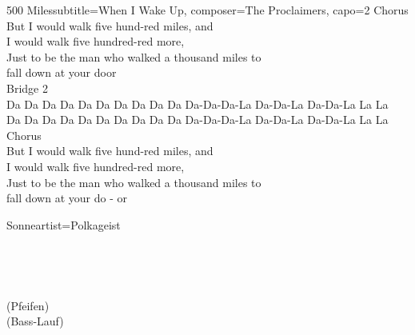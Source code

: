 \begin{song}{500 Miles}{subtitle={When I Wake Up}, composer={The Proclaimers}, capo={2}}
Chorus \\
But I would walk five hund-red miles, and \\
I would walk five hundred-red  more, \\
Just to be the man who walked a thousand  miles to \\
fall down at your door    \\

Bridge 2 \\

Da Da Da Da          Da Da Da Da      Da Da Da-Da-Da-La Da-Da-La Da-Da-La La La \\

Da Da Da Da           Da Da Da Da      Da Da Da-Da-Da-La Da-Da-La Da-Da-La La La \\

Chorus \\
But I would walk five hund-red miles, and \\
I would walk five hundred-red  more, \\
Just to be the man who walked a thousand  miles to \\
fall down  at  your  do  -  or  \\
\end{song}

\begin{song}{Sonne}{artist={Polkageist}}

 ~

 ~

(Pfeifen)~ \\
(Bass-Lauf) \\
\end{song}

